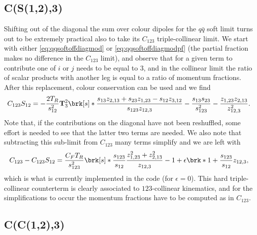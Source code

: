 \documentclass[11pt,a4paper]{article}
\newcommand{\eps}[0]{\epsilon}
\newcommand{\colorT}[1]{\mathbf{T}_{#1}}
\begin{document}
\subsection{C(S(1,2),3)}

Shifting out of the diagonal the sum over colour dipoles for the $q\bar{q}$ soft limit
turns out to be extremely practical also to take its $C_{123}$ triple-collinear limit.
We start with either \cref{eq:qqsoftoffdiagmod} or \cref{eq:qqsoftoffdiagmodpf}
(the partial fraction makes no difference in the $C_{123}$ limit), and observe that
for a given term to contribute one of $i$ or $j$ needs to be equal to $3$,
and in the collinear limit the ratio of scalar products with another leg
is equal to a ratio of momentum fractions.
After this replacement, colour conservation can be used and we find
\begin{equation}
	C_{123}S_{12} = - \frac{2T_R}{s_{12}^2} \colorT{3}^2
	\brk[s]*{
		\frac{s_{13} z_{2,13} + s_{23} z_{1,23} - s_{12} z_{3,12}}
		{s_{123} z_{12,3}}
		- \frac{s_{13}s_{23}}{s_{123}^2} - \frac{z_{1,23} z_{2,13}}{z_{12,3}^2}
	}.
\end{equation}
Note that, if the contributions on the diagonal have not been reshuffled,
some effort is needed to see that the latter two terms are needed.
We also note that subtracting this sub-limit from $C_{123}$
many terms simplify and we are left with
\begin{equation}
	C_{123} - C_{123}S_{12} = \frac{C_F T_R}{s_{123}^2} \brk[s]*{
		\frac{s_{123}}{s_{12}} \frac{z_{1,23}^2 + z_{2,13}^2}{z_{12,3}} - 1
		+ \eps \brk*{1 + \frac{s_{123}}{s_{12}} z_{12,3} }
	},
\end{equation}
which is what is currently implemented in the code (for $\eps=0$).
This hard triple-collinear counterterm is clearly associated
to $123$-collinear kinematics, and for the simplifications to occur
the momentum fractions have to be computed as in $C_{123}$.


\subsection{C(C(1,2),3)}
\end{document}

